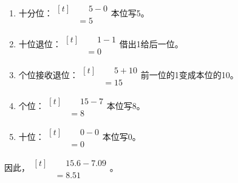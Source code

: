 {\begin{enumerate}[leftmargin=1.7em,itemsep=5pt,topsep=0pt]
\item 十分位：\(\begin{aligned}[t]&\phantom{={}}5-0\\&=5\end{aligned}\)\quad 本位写5。
\item 十位退位：\(\begin{aligned}[t]&\phantom{={}}1-1\\&=0\end{aligned}\)\quad 借出1给后一位。
\item 个位接收退位：\(\begin{aligned}[t]&\phantom{={}}5+10\\&=15\end{aligned}\)\quad 前一位的1变成本位的10。
\item 个位：\(\begin{aligned}[t]&\phantom{={}}15-7\\&=8\end{aligned}\)\quad 本位写8。
\item 十位：\(\begin{aligned}[t]&\phantom{={}}0-0\\&=0\end{aligned}\)\quad 本位写0。
\end{enumerate}
\par\smallskip
因此，\(\begin{aligned}[t]&\phantom{={}}15.6-7.09\\&=8.51\end{aligned}\)。
\par\medskip

}
